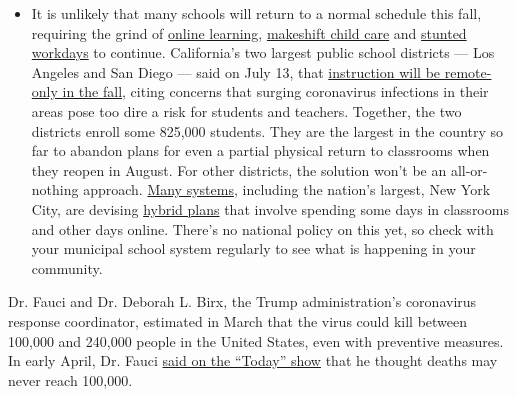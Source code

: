 \begin{itemize}
  \begin{itemize}
  \tightlist
  \item
    It is unlikely that many schools will return to a normal schedule
    this fall, requiring the grind of
    \href{https://www.nytimes.com/2020/06/05/us/coronavirus-education-lost-learning.html?action=click\&pgtype=Article\&state=default\&region=MAIN_CONTENT_3\&context=storylines_faq}{online
    learning},
    \href{https://www.nytimes.com/2020/05/29/us/coronavirus-child-care-centers.html?action=click\&pgtype=Article\&state=default\&region=MAIN_CONTENT_3\&context=storylines_faq}{makeshift
    child care} and
    \href{https://www.nytimes.com/2020/06/03/business/economy/coronavirus-working-women.html?action=click\&pgtype=Article\&state=default\&region=MAIN_CONTENT_3\&context=storylines_faq}{stunted
    workdays} to continue. California's two largest public school
    districts --- Los Angeles and San Diego --- said on July 13, that
    \href{https://www.nytimes.com/2020/07/13/us/lausd-san-diego-school-reopening.html?action=click\&pgtype=Article\&state=default\&region=MAIN_CONTENT_3\&context=storylines_faq}{instruction
    will be remote-only in the fall}, citing concerns that surging
    coronavirus infections in their areas pose too dire a risk for
    students and teachers. Together, the two districts enroll some
    825,000 students. They are the largest in the country so far to
    abandon plans for even a partial physical return to classrooms when
    they reopen in August. For other districts, the solution won't be an
    all-or-nothing approach.
    \href{https://bioethics.jhu.edu/research-and-outreach/projects/eschool-initiative/school-policy-tracker/}{Many
    systems}, including the nation's largest, New York City, are
    devising
    \href{https://www.nytimes.com/2020/06/26/us/coronavirus-schools-reopen-fall.html?action=click\&pgtype=Article\&state=default\&region=MAIN_CONTENT_3\&context=storylines_faq}{hybrid
    plans} that involve spending some days in classrooms and other days
    online. There's no national policy on this yet, so check with your
    municipal school system regularly to see what is happening in your
    community.
  \end{itemize}
\end{itemize}

Dr. Fauci and Dr. Deborah L. Birx, the Trump administration's
coronavirus response coordinator, estimated in March that the virus
could kill between 100,000 and 240,000 people in the United States, even
with preventive measures. In early April, Dr. Fauci
\href{https://www.today.com/video/dr-anthony-fauci-virus-death-toll-may-be-more-like-60-000-than-100-000-to-200-000-81825861735}{said
on the ``Today'' show} that he thought deaths may never reach 100,000.

